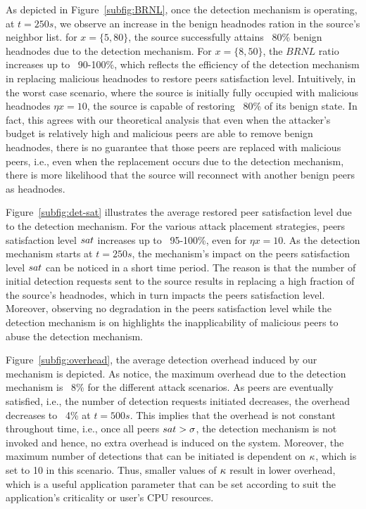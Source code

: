 As depicted in Figure~\ref{subfig:BRNL}, once the detection mechanism is operating, at $t=250s$, we observe an increase in the benign headnodes ration in the source's neighbor list.
for $x=\{5, 80\}$, the source successfully attains ~80\% benign headnodes due to the detection mechanism.
For $x=\{8, 50\}$, the $BRNL$ ratio increases up to ~90-100\%, which reflects the efficiency of the detection mechanism in replacing malicious headnodes to restore peers satisfaction level.
Intuitively, in the worst case scenario, where the source is initially fully occupied with malicious headnodes $\eta x=10$, the source is capable of restoring ~80\% of its benign state.
In fact, this agrees with our theoretical analysis that even when the attacker's budget is relatively high and malicious peers are able to remove benign headnodes, there is no guarantee that those peers are replaced with malicious peers, 
i.e., even when the replacement occurs due to the detection mechanism, there is more likelihood that the source will reconnect with another benign peers as headnodes.


Figure~\ref{subfig:det-sat} illustrates the average restored peer satisfaction level due to the detection mechanism.
For the various attack placement strategies, peers satisfaction level $sat$ increases up to ~95-100\%, even for $\eta x=10$.
As the detection mechanism starts at $t=250s$, the mechanism's impact on the peers satisfaction level $sat$ can be noticed in a short time period.
The reason is that the number of initial detection requests sent to the source results in replacing a high fraction of the source's headnodes, which in turn impacts the peers satisfaction level.
Moreover, observing no degradation in the peers satisfaction level while the detection mechanism is on highlights the inapplicability of malicious peers to abuse the detection mechanism.

Figure~\ref{subfig:overhead}, the average detection overhead induced by our mechanism is depicted.
As notice, the maximum overhead due to the detection mechanism is ~8\% for the different attack scenarios.
As peers are eventually satisfied, i.e., the number of detection requests initiated decreases, the overhead decreases to ~4\% at $t=500s$.
This implies that the overhead is not constant throughout time, i.e., once all peers $sat > \sigma$, the detection mechanism is not invoked and hence, no extra overhead is induced on the system.
Moreover, the maximum number of detections that can be initiated is dependent on $\kappa$, which is set to 10 in this scenario.
Thus, smaller values of $\kappa$ result in lower overhead, which is a useful application parameter that can be set according to suit the application's criticality or user's CPU resources.


